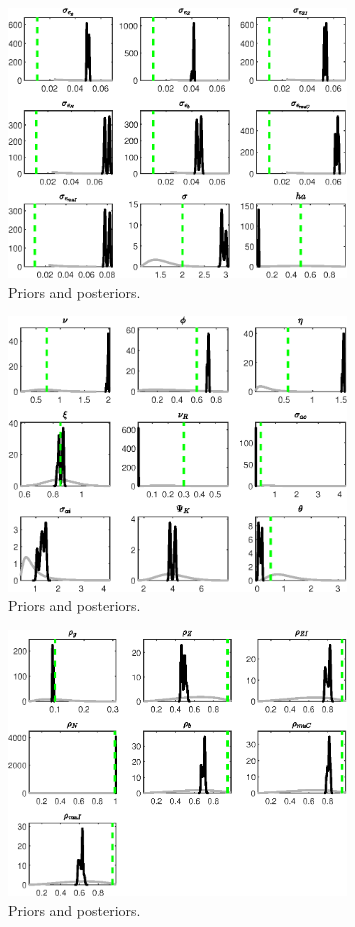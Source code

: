  
\begin{figure}[H]
\centering
\includegraphics[width=0.80\textwidth]{BRS_sectoral_wo_demand_shocks/Output/BRS_sectoral_wo_demand_shocks_PriorsAndPosteriors1}
\caption{Priors and posteriors.}\label{Fig:PriorsAndPosteriors:1}
\end{figure}
 
\begin{figure}[H]
\centering
\includegraphics[width=0.80\textwidth]{BRS_sectoral_wo_demand_shocks/Output/BRS_sectoral_wo_demand_shocks_PriorsAndPosteriors2}
\caption{Priors and posteriors.}\label{Fig:PriorsAndPosteriors:2}
\end{figure}
 
\begin{figure}[H]
\centering
\includegraphics[width=0.80\textwidth]{BRS_sectoral_wo_demand_shocks/Output/BRS_sectoral_wo_demand_shocks_PriorsAndPosteriors3}
\caption{Priors and posteriors.}\label{Fig:PriorsAndPosteriors:3}
\end{figure}
 
